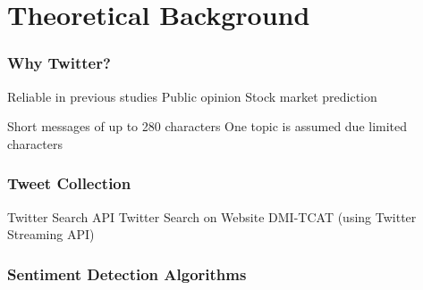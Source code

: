 
\section{Theoretical Background}

\begin{frame}
    \frametitle{Why Twitter?}

    \begin{outline}
        \1 Reliable in previous studies \citep{Barbosa2010}
            \2 Public opinion \citep{Oconnor2010a,Patodkar2016a}
            \2 Stock market prediction \citep{Mittal2012a,Nguyen2015a,Pagolu2016a,Zhang2011a}

        \1 Short messages of up to 280 characters \citep{Rosen2017}
        \1 One topic is assumed due limited characters \citep{Pagolu2016a,Patodkar2016a}
    \end{outline}
\end{frame}
  

\begin{frame}
    \frametitle{Tweet Collection}

    \begin{outline}
        \1 Twitter Search API
        \1 Twitter Search on Website
        \1 DMI-TCAT (using Twitter Streaming API)
    \end{outline}
\end{frame}

\begin{frame}
    \frametitle{Sentiment Detection Algorithms}

    \begin{outline}
        \1 \tb{}
        \1 \nb{}
        \1 \me{}
        \1 \svm{}
    \end{outline}
\end{frame}

